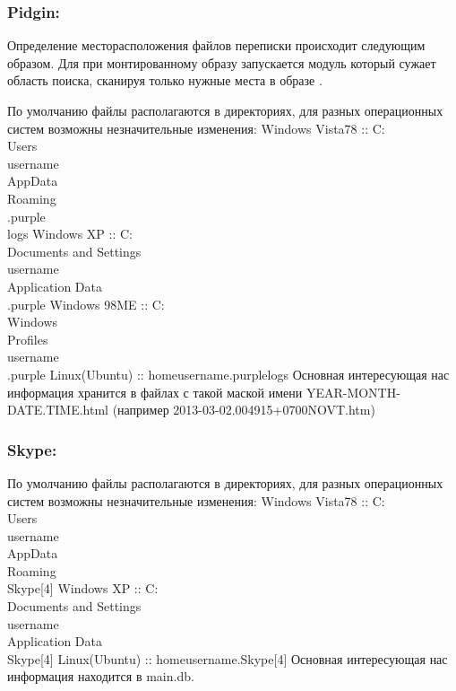 \subsubsection{Pidgin:}
Определение месторасположения файлов переписки происходит следующим образом. Для при монтированному образу запускается модуль который сужает область поиска, сканируя только нужные места в образе . 

По умолчанию файлы располагаются в директориях, для разных операционных систем возможны незначительные изменения: 
Windows Vista\/7\/8 :: C:\\Users\\username\\AppData\\Roaming\\.purple\\logs
Windows XP 		:: C:\\Documents and Settings\\username\\Application Data\\.purple
Windows 98\/ME 	:: C:\\Windows\\Profiles\\username\\.purple
Linux(Ubuntu) 	:: \/home\/username\/.purple\/logs
Основная интересующая нас информация хранится в файлах с такой маской имени YEAR-MONTH-DATE.TIME.html (например 2013-03-02.004915+0700NOVT.htm)\\

\subsubsection{Skype:}
По умолчанию файлы располагаются в директориях, для разных операционных систем возможны незначительные изменения: 
Windows Vista\/7\/8 :: C:\\Users\\username\\AppData\\Roaming\\Skype[4]
Windows XP 		:: C:\\Documents and Settings\\username\\Application Data\\Skype[4]
Linux(Ubuntu) 	:: \/home\/username\/.Skype[4]
Основная интересующая нас информация находится в main.db.\\

